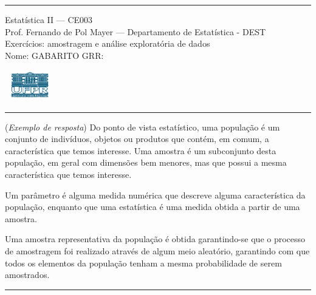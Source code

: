 \documentclass[a4paper,11pt,fleqn]{article}\usepackage[]{graphicx}\usepackage[]{color}
\theoremstyle{definition}
\begin{document}
\reversemarginpar %





\hrule
\vspace{0.3cm}

\begin{minipage}[c]{.85\textwidth}
  Estatística II --- CE003 \\
  Prof. Fernando de Pol Mayer --- Departamento de Estatística - DEST \\
  Exercícios: amostragem e análise exploratória de dados \\
  Nome: GABARITO  \hfill GRR: \hspace{2cm}
\end{minipage}\hfill
\begin{minipage}[c]{.15\textwidth}
\flushright
\includegraphics[width=2.2cm]{../img/ufpr-logo.png}
\end{minipage}

\vspace{0.3cm}
\hrule
\vspace{0.3cm}

\begin{compactenum}[1.]
\item (\textit{Exemplo de resposta}) Do ponto de vista estatístico, uma
  população é um conjunto de indivíduos, objetos ou produtos que contém,
  em comum, a característica que temos interesse. Uma amostra é um
  subconjunto desta população, em geral com dimensões bem menores, mas
  que possui a mesma característica que temos interesse.

  Um parâmetro é alguma medida numérica que descreve alguma
  característica da população, enquanto que uma estatística é uma medida
  obtida a partir de uma amostra.

  Uma amostra representativa da população é obtida garantindo-se que o
  processo de amostragem foi realizado através de algum meio aleatório,
  garantindo com que todos os elementos da população tenham a mesma
  probabilidade de serem amostrados.
\end{compactenum}

\vspace{0.3cm}
\hrule
\vspace{0.3cm}
\end{document}
